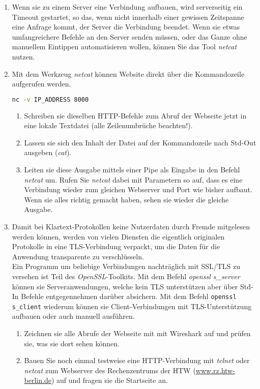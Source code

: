 \documentclass[paper=a4,fontsize=11pt]{scrartcl}%
\numberwithin{equation}{section}
\begin{document}
\begin{enumerate}
	\item Wenn sie zu einem Server eine Verbindung aufbauen, wird serverseitig ein Timeout gestartet, so das, wenn nicht innerhalb einer gewissen Zeitspanne eine Anfrage kommt, der Server die Verbindung beendet. Wenn sie etwas umfangreichere Befehle an den Server senden müssen, oder das Ganze ohne manuellem Eintippen automatisieren wollen, können Sie das Tool \emph{netcat} nutzen.	
	\item Mit dem Werkzeug \emph{netcat} können Website direkt über die Kommandozeile aufgerufen werden.
	\begin{lstlisting}[style=Bash, language=Bash]
nc -v IP_ADDRESS 8000
\end{lstlisting}
	\begin{enumerate}
		\item Schreiben sie dieselben HTTP-Befehle zum Abruf der Webseite jetzt in eine lokale Textdatei (alle Zeilenumbrüche beachten!).
		\item Lassen sie sich den Inhalt der Datei auf der Kommandozeile nach Std-Out ausgeben (\emph{cat}).
		\item Leiten sie diese Ausgabe mittels einer Pipe als Eingabe in den Befehl \emph{netcat} um. Rufen Sie \emph{netcat} dabei mit  Parametern so auf, dass es eine Verbindung wieder zum gleichen Webserver und Port wie bisher aufbaut.\\
 Wenn sie alles richtig gemacht haben, sehen sie wieder die gleiche Ausgabe.
	\end{enumerate}
	\item Damit bei Klartext-Protokollen keine Nutzerdaten durch Fremde mitgelesen werden können, werden von vielen Diensten die eigentlich originalen Protokolle in eine TLS-Verbindung verpackt, um die Daten für die Anwendung transparente zu verschlüsseln.\\
Ein Programm um beliebige Verbindungen nachträglich mit SSL/TLS zu versehen ist Teil des \emph{OpenSSL}-Toolkits. Mit dem Befehl \emph{openssl s\_server} können sie Serveranwendungen, welche kein TLS unterstützen aber über Std-In Befehle entgegennehmen darüber absichern. Mit dem Befehl \texttt{openssl s\_client} wiederum können sie Client-Verbindungen mit TLS-Unterstützung aufbauen oder auch manuell ausführen.
	\begin{enumerate}
		\item Zeichnen sie alle Abrufe der Webseite mit mit Wireshark auf und prüfen sie, was sie dort sehen können.
		\item Bauen Sie noch einmal testweise eine HTTP-Verbindung mit \emph{telnet} oder \emph{netcat} zum Webserver des Rechenzentrums der HTW (\url{www.rz.htw-berlin.de}) auf und fragen sie die Startseite an.

\end{enumerate}
\end{enumerate}
\end{document}
